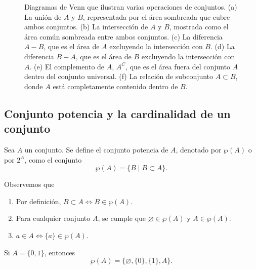 \begin{figure*}[h!]
{
    }
    \caption{Diagramas de Venn que ilustran varias operaciones de conjuntos. (a) La unión de $A$ y $B$, representada por el área sombreada que cubre ambos conjuntos. (b) La intersección de $A$ y $B$, mostrada como el área común sombreada entre ambos conjuntos. (c) La diferencia $A - B$, que es el área de $A$ excluyendo la intersección con $B$. (d) La diferencia $B - A$, que es el área de $B$ excluyendo la intersección con $A$. (e) El complemento de $A$, $A^C$, que es el área fuera del conjunto $A$ dentro del conjunto universal. (f) La relación de subconjunto $A \subset B$, donde $A$ está completamente contenido dentro de $B$.}
\end{figure*}

\subsection{Conjunto potencia y la cardinalidad de un conjunto}

\begin{definicion}{}{}
    Sea $A$ un conjunto. Se define el conjunto potencia de $A$, denotado por $\wp(A)$ o por $2^A$, como el conjunto
    $$\wp(A) = \{B \mid B \subset A\}.$$
\end{definicion}

\newpage

Observemos que
\begin{enumerate}
    \item Por definición, $B \subset A \Longleftrightarrow B \in \wp(A)$.
    \item Para cualquier conjunto $A$, se cumple que $\varnothing \in \wp(A)$ y $A \in \wp(A)$.
    \item $a \in A \Longleftrightarrow \{a\} \in \wp(A)$.
\end{enumerate}

\begin{examplebox}{}{}
    Si $A = \{0, 1\}$, entonces
    $$\wp(A) = \big\{\varnothing, \{0\}, \{1\}, A \big\}.$$
\end{examplebox}

